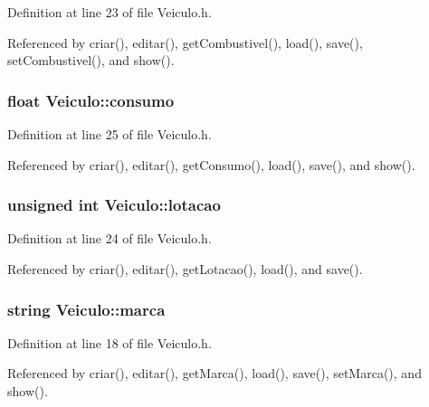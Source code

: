 Definition at line 23 of file Veiculo.\+h.



Referenced by criar(), editar(), get\+Combustivel(), load(), save(), set\+Combustivel(), and show().

\hypertarget{class_veiculo_ab403615f82fdad74215512cedce23762}{
\subsubsection[{consumo}]{\setlength{\rightskip}{0pt plus 5cm}float Veiculo\+::consumo\hspace{0.3cm}{\ttfamily [private]}}}\label{class_veiculo_ab403615f82fdad74215512cedce23762}


Definition at line 25 of file Veiculo.\+h.



Referenced by criar(), editar(), get\+Consumo(), load(), save(), and show().

\hypertarget{class_veiculo_af9dc20956b1b60e54b9a79f76cd971d3}{
\subsubsection[{lotacao}]{\setlength{\rightskip}{0pt plus 5cm}unsigned int Veiculo\+::lotacao\hspace{0.3cm}{\ttfamily [private]}}}\label{class_veiculo_af9dc20956b1b60e54b9a79f76cd971d3}


Definition at line 24 of file Veiculo.\+h.



Referenced by criar(), editar(), get\+Lotacao(), load(), and save().

\hypertarget{class_veiculo_ab20b89442a0ddaedd074bb0de75838c8}{
\subsubsection[{marca}]{\setlength{\rightskip}{0pt plus 5cm}string Veiculo\+::marca\hspace{0.3cm}{\ttfamily [private]}}}\label{class_veiculo_ab20b89442a0ddaedd074bb0de75838c8}


Definition at line 18 of file Veiculo.\+h.



Referenced by criar(), editar(), get\+Marca(), load(), save(), set\+Marca(), and show().


